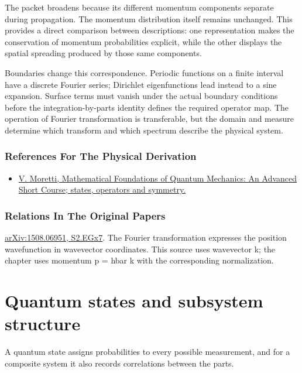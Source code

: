 \documentclass[11pt,oneside]{book}
\begin{document}
The packet broadens because its different momentum components separate during propagation. The momentum distribution itself remains unchanged. This provides a direct comparison between descriptions: one representation makes the conservation of momentum probabilities explicit, while the other displays the spatial spreading produced by those same components.

Boundaries change this correspondence. Periodic functions on a finite interval have a discrete Fourier series; Dirichlet eigenfunctions lead instead to a sine expansion. Surface terms must vanish under the actual boundary conditions before the integration-by-parts identity defines the required operator map. The operation of Fourier transformation is transferable, but the domain and measure determine which transform and which spectrum describe the physical system.

\subsection*{References For The Physical Derivation}
\begin{itemize}
\item \href{https://arxiv.org/abs/1508.06951}{V. Moretti, Mathematical Foundations of Quantum Mechanics: An Advanced Short Course; states, operators and symmetry.}
\end{itemize}

\subsection*{Relations In The Original Papers}

\href{https://arxiv.org/html/1508.06951#S2.EGx7}{arXiv:1508.06951, S2.EGx7}. The Fourier transformation expresses the position wavefunction in wavevector coordinates. This source uses wavevector k; the chapter uses momentum p = hbar k with the corresponding normalization.



\chapter{Quantum states and subsystem structure}

\begin{claimbox}

A quantum state assigns probabilities to every possible measurement, and for a composite system it also records correlations between the parts.

\end{claimbox}
\end{document}
